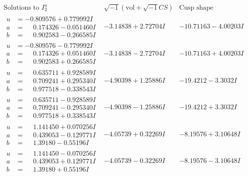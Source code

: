 \documentclass[1p]{elsarticle_modified}
\theoremstyle{definition}
\newcommand{\I}{\sqrt{-1}}
\begin{document}
$$\begin{array}{c|c|c}  
\text{Solutions to }I^u_{2}& \I (\text{vol} + \sqrt{-1}CS) & \text{Cusp shape}\\
 \hline 
\begin{aligned}
u &= -0.809576 + 0.779992 I \\
a &= \phantom{-}0.174326 - 0.051460 I \\
b &= \phantom{-}0.902583 - 0.266585 I\end{aligned}
 & -3.14838 + 2.72704 I & -10.71163 - 4.00203 I \\ \hline\begin{aligned}
u &= -0.809576 - 0.779992 I \\
a &= \phantom{-}0.174326 + 0.051460 I \\
b &= \phantom{-}0.902583 + 0.266585 I\end{aligned}
 & -3.14838 - 2.72704 I & -10.71163 + 4.00203 I \\ \hline\begin{aligned}
u &= \phantom{-}0.635711 + 0.928589 I \\
a &= \phantom{-}0.709241 + 0.295340 I \\
b &= \phantom{-}0.977518 - 0.338543 I\end{aligned}
 & -4.90398 + 1.25886 I & -19.4212 - 3.3032 I \\ \hline\begin{aligned}
u &= \phantom{-}0.635711 - 0.928589 I \\
a &= \phantom{-}0.709241 - 0.295340 I \\
b &= \phantom{-}0.977518 + 0.338543 I\end{aligned}
 & -4.90398 - 1.25886 I & -19.4212 + 3.3032 I \\ \hline\begin{aligned}
u &= \phantom{-}1.141450 + 0.070256 I \\
a &= \phantom{-}0.439053 - 0.129771 I \\
b &= \phantom{-}1.39180 - 0.55196 I\end{aligned}
 & -4.05739 + 0.32269 I & -8.19576 + 3.10648 I \\ \hline\begin{aligned}
u &= \phantom{-}1.141450 - 0.070256 I \\
a &= \phantom{-}0.439053 + 0.129771 I \\
b &= \phantom{-}1.39180 + 0.55196 I\end{aligned}
 & -4.05739 - 0.32269 I & -8.19576 - 3.10648 I \\ \hline\begin{aligned}

\end{aligned}
\end{array}$$
\end{document}
